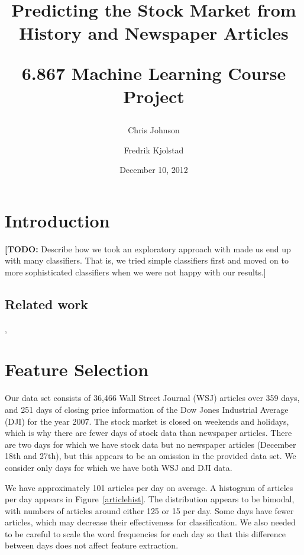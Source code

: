 \documentclass[10pt, twocolumn]{article}
\def\TODO#1{\noindent\textbf{[TODO:} #1]}
\begin{document}
\title{Predicting the Stock Market from History and Newspaper Articles \\ \begin{large}6.867 Machine Learning Course Project\end{large}}

\author{Chris Johnson \and Fredrik Kjolstad}
\date{December 10, 2012}
\maketitle

\begin{abstract}
\end{abstract}

\section{Introduction}




\TODO{Describe how we took an exploratory approach with made us end up with many classifiers. That is, we tried simple classifiers first and moved on to more sophisticated classifiers when we were not happy with our results.}

\subsection{Related work}
\cite{twitter}, \cite{mlstockmarket}

\section{Feature Selection}

Our data set consists of 36,466 Wall Street Journal (WSJ) articles over 359 days, and 251 days of closing price information of the Dow Jones Industrial Average (DJI) for the year 2007. The stock market is closed on weekends and holidays, which is why there are fewer days of stock data than newspaper articles. There are two days for which we have stock data but no newspaper articles (December 18th and 27th), but this appears to be an omission in the provided data set. We consider only days for which we have both WSJ and DJI data. 

We have approximately 101 articles per day on average. A histogram of articles per day appears in Figure~\ref{articlehist}. The distribution appears to be bimodal, with numbers of articles around either 125 or 15 per day. Some days have fewer articles, which may decrease their effectiveness for classification. We also needed to be careful to scale the word frequencies for each day so that this difference between days does not affect feature extraction.
\end{document}
